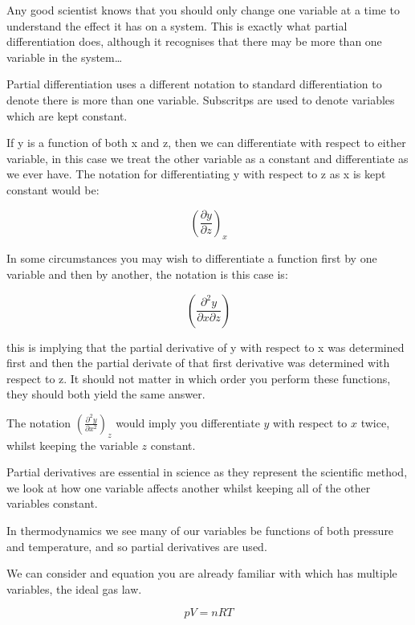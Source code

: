 \documentclass[
]{book}
\begin{document}
Any good scientist knows that you should only change one variable at a time to understand the effect it has on a system. This is exactly what partial differentiation does, although it recognises that there may be more than one variable in the system\ldots{}

Partial differentiation uses a different notation to standard differentiation to denote there is more than one variable. Subscritps are used to denote variables which are kept constant.

If y is a function of both x and z, then we can differentiate with respect to either variable, in this case we treat the other variable as a constant and differentiate as we ever have. The notation for differentiating y with respect to z as x is kept constant would be:

\begin{equation*}
\left(\frac{\partial y}{\partial z}\right)_x
\end{equation*}

In some circumstances you may wish to differentiate a function first by one variable and then by another, the notation is this case is:

\begin{equation*}
\left(\frac{\partial^2 y}{\partial x \partial z}\right)
\end{equation*}

this is implying that the partial derivative of y with respect to x was determined first and then the partial derivate of that first derivative was determined with respect to z. It should not matter in which order you perform these functions, they should both yield the same answer.

The notation \(\left(\frac{\partial^2 y}{\partial x ^2}\right)_z\) would imply you differentiate \(y\) with respect to \(x\) twice, whilst keeping the variable \(z\) constant.

Partial derivatives are essential in science as they represent the scientific method, we look at how one variable affects another whilst keeping all of the other variables constant.

In thermodynamics we see many of our variables be functions of both pressure and temperature, and so partial derivatives are used.

We can consider and equation you are already familiar with which has multiple variables, the ideal gas law.

\begin{equation}
pV = nRT
\label{eq:idealgas}
\end{equation}
\end{document}
